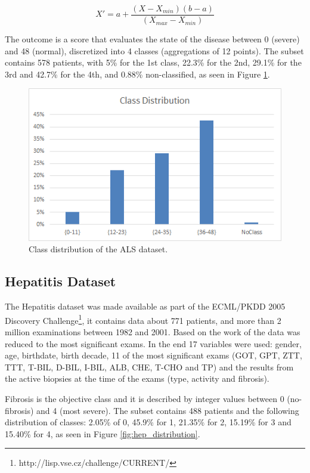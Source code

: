  \begin{equation}
 X'= a + \frac{(X-X_{min})(b-a)}{(X_{max} - X_{min})}
 \label{eq:featurescaling}
 \end{equation} 

The outcome is a score that evaluates the state of the disease between 0 (severe) and 48 (normal), discretized into 
4 classes (aggregations of 12 points). The subset contains 578 patients, with 5\% for the 1st class, 22.3\% for the 2nd,
 29.1\% for the 3rd and 42.7\% for the 4th, and 0.88\% non-classified, as seen in Figure \ref{fig:als_distribution}.
 
  \begin{figure}[h]
  	\centering
  	\includegraphics[width=0.49\linewidth]{Figures/class_distribution_als.png}
  	\caption{Class distribution of the ALS dataset.}
  	\label{fig:als_distribution}
  \end{figure}

\subsection{Hepatitis Dataset}
\label{subsection:hepatitis}

The Hepatitis dataset was made available as part of the ECML/PKDD 2005 Discovery 
Challenge\footnote{http://lisp.vse.cz/challenge/CURRENT/}, it contains data about
 771 patients, and more than 2 million examinations between 1982 and 2001. Based on the work of \cite{Watanabe2003}
 the data was reduced to the most significant exams. In the end 17 variables were used: gender, age, birthdate, birth decade, 
 11 of the most significant exams (GOT, GPT, ZTT, TTT, T-BIL, D-BIL, I-BIL, ALB, CHE, T-CHO and TP) and the results from the
 active biopsies at the time of the exams (type, activity and fibrosis).

Fibrosis is the objective class and it is described by integer values between 0 (no-fibrosis) and 4 (most severe).
 The subset contains 488 patients and the following distribution of 
 classes: 2.05\% of 0, 45.9\% for 1, 21.35\% for 2, 15.19\% for 3 and 15.40\% for 4, as seen in Figure \ref{fig:hep_distribution}.
 

